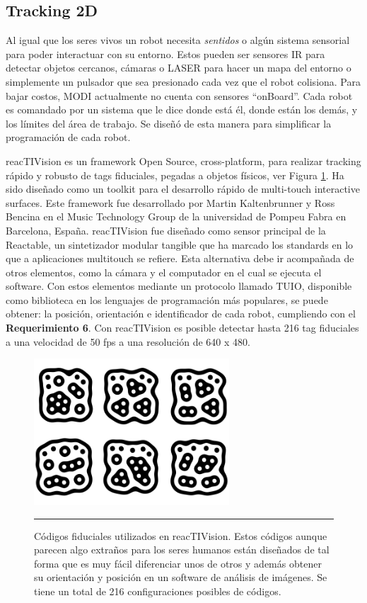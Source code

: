 \subsection{Tracking 2D}
Al igual que los seres vivos un robot necesita \textit{sentidos} o algún sistema sensorial para poder interactuar con su entorno. Estos pueden ser sensores IR para detectar objetos cercanos, cámaras o LASER para hacer un mapa del entorno o simplemente un pulsador que sea presionado cada vez que el robot colisiona. Para bajar costos, MODI actualmente no cuenta con sensores “onBoard”. Cada robot es comandado por un sistema que le dice donde está él, donde están los demás, y los límites del área de trabajo. Se diseñó de esta manera para simplificar la programación de cada robot.

reacTIVision \cite{kaltenbrunner2007reactivision} es un framework Open Source, cross-platform, para realizar tracking rápido y robusto de tags fiduciales, pegadas a objetos físicos, ver Figura \ref{fig:Fiducial}. Ha sido diseñado como un toolkit para el desarrollo rápido de multi-touch interactive surfaces. Este framework fue desarrollado por Martin Kaltenbrunner y Ross Bencina en el Music Technology Group de la universidad de Pompeu Fabra en Barcelona, España. reacTIVision fue diseñado como sensor principal de la Reactable, un sintetizador modular tangible que ha marcado los standards en lo que a aplicaciones multitouch se refiere. 
Esta alternativa debe ir acompañada de otros elementos, como la cámara y el computador en el cual se ejecuta el software. Con estos elementos mediante un protocolo llamado TUIO, disponible como biblioteca en los lenguajes de programación más populares, se puede obtener: la posición, orientación e identificador de cada robot, cumpliendo con el \textbf{Requerimiento 6}. Con reacTIVision es posible detectar hasta 216 tag fiduciales a una velocidad de 50 fps a una resolución de 640 x 480.




\begin{figure}[htbp]
	\centering
		\includegraphics[width=0.65\textwidth]{./Figures/MODI/fiducial.png}
		\rule{35em}{0.5pt}
	\caption[Fiduciales usados como tag en reacTIVision]{Códigos fiduciales utilizados en reacTIVision. Estos códigos aunque parecen algo extraños para los seres humanos están diseñados de tal forma que es muy fácil diferenciar unos de otros y además obtener su orientación y posición en un software de análisis de imágenes. Se tiene un total de 216 configuraciones posibles de códigos.}
	\label{fig:Fiducial}
\end{figure}



